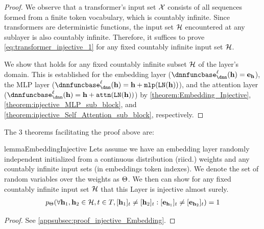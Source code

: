 \begin{proof}
    We observe that a transformer's input set $\mathcal{X}$ consists of all sequences formed from a finite token vocabulary, which is countably infinite. Since transformers are deterministic functions, the input set $\mathcal{H}$ encountered at any sublayer is also countably infinite. Therefore, it suffices to prove \cref{eq:transformer_injective_1} for any fixed countably infinite input set $\mathcal{H}$.

    We show that  holds for any fixed countably infinite subset $\mathcal{H}$ of the layer's domain. This is established for the embedding layer ($\dnnfunclayer{\layer}(\hiddenstates)=\embeddings_{\hiddenstates}$), the MLP layer ($\dnnfunclayer{\layer}(\hiddenstates)=\hiddenstates+\mlpfunc(\layerNorm(\hiddenstates))$), and the attention layer ($\dnnfunclayer{\layer}(\hiddenstates)=\hiddenstates+\selfattention(\layerNorm(\hiddenstates))$) by \cref{theorem:Embedding_Injective}, \cref{theorem:injective_MLP_sub_block}, and \cref{theorem:injective_Self_Attention_sub_block}, respectively.
\end{proof}

The 3 theorems facilitating the proof above are:
\begin{restatable}{lemma}{EmbeddingInjective}\label{theorem:Embedding_Injective}
    Lets assume we have an embedding layer randomly independent initialized from a continuous distribution (riicd.) weights and any countably infinite input sets (in embeddings token indexes). We denote the set of random variables over the weights as $\Theta$. We then can show for any fixed countably infinite input set $\mathcal{H}$ that this Layer is injective almost surely.
    \begin{align} \label{eq:theorem_Embedding_Injective}
        p_{\Theta}(\forall \mathbf{h}_1,\mathbf{h}_2\in \mathcal{H},t\in T, [\mathbf{h}_1]_{t}\neq[\mathbf{h}_2]_{t}: [\mathbf{e}_{\mathbf{h}_1}]_{t}\neq[\mathbf{e}_{\mathbf{h}_2}]_{t})=1
    \end{align}
\end{restatable}
\begin{proof}
    See \cref{appsubsec:proof_injective_Embedding}.
\end{proof}

